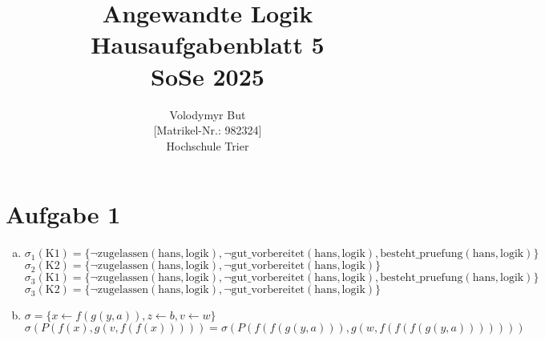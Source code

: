 \documentclass[10pt, oneside]{article}
\title{Angewandte Logik\\[15pt]\Large{Hausaufgabenblatt 5}\\[10pt]\Large{SoSe 2025}}
\author{Volodymyr But\\[5pt][Matrikel-Nr.: 982324]\\[10pt]Hochschule Trier}
\date{}
\begin{document}
\maketitle
\vspace{25px}

\section{Aufgabe 1}

\begin{enumerate}[(a)]
    \item
        $\sigma_1(\text{K}1) = \{\lnot\text{zugelassen}(\text{hans}, \text{logik}), \lnot\text{gut\_vorbereitet}(\text{hans}, \text{logik}), \text{besteht\_pruefung}(\text{hans}, \text{logik})\}$ \\[5pt]
        $\sigma_2(\text{K}2) = \{\lnot\text{zugelassen}(\text{hans}, \text{logik}), \lnot\text{gut\_vorbereitet}(\text{hans}, \text{logik})\}$ \\[5pt]
        $\sigma_3(\text{K}1) = \{\lnot\text{zugelassen}(\text{hans}, \text{logik}), \lnot\text{gut\_vorbereitet}(\text{hans}, \text{logik}), \text{besteht\_pruefung}(\text{hans}, \text{logik})\}$ \\[5pt]
        $\sigma_3(\text{K}2) = \{\lnot\text{zugelassen}(\text{hans}, \text{logik}), \lnot\text{gut\_vorbereitet}(\text{hans}, \text{logik})\}$ \\[5pt]

    \item
        $\sigma = \{x \leftarrow f(g(y, a)), z \leftarrow b, v \leftarrow w\}$ \\[5pt]
        $\sigma(P(f(x), g(v, f(f(x))))) = \sigma(P(f(f(g(y, a))), g(w, f(f(f(g(y, a)))))))$
\end{enumerate}
\end{document}
